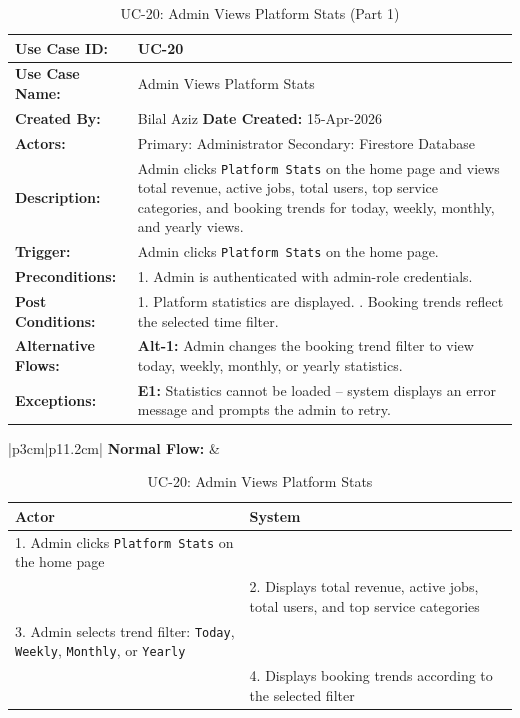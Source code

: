 {\small
\renewcommand{\arraystretch}{1.05}
\begin{table}[H]
\centering
\begin{tabular}{|p{3cm}|p{11.2cm}|}
\hline
\textbf{Use Case ID:} & UC-20 \\ \hline
\textbf{Use Case Name:} & Admin Views Platform Stats \\ \hline
\textbf{Created By:} & Bilal Aziz \hfill \textbf{Date Created:} 15-Apr-2026 \\ \hline
\textbf{Actors:} & Primary: Administrator \quad Secondary: Firestore Database \\ \hline
\textbf{Description:} & Admin clicks \texttt{Platform Stats} on the home page and views total revenue, active jobs, total users, top service categories, and booking trends for today, weekly, monthly, and yearly views. \\ \hline
\textbf{Trigger:} & Admin clicks \texttt{Platform Stats} on the home page. \\ \hline
\textbf{Preconditions:} & 1. Admin is authenticated with admin-role credentials. \\ \hline
\textbf{Post Conditions:} & 1. Platform statistics are displayed. \newline 2. Booking trends reflect the selected time filter. \\ \hline
\textbf{Alternative Flows:} & \textbf{Alt-1:} Admin changes the booking trend filter to view today, weekly, monthly, or yearly statistics. \\ \hline
\textbf{Exceptions:} & \textbf{E1:} Statistics cannot be loaded -- system displays an error message and prompts the admin to retry. \\ \hline
\end{tabular}
\caption*{UC-20: Admin Views Platform Stats (Part 1)}
\end{table}
}

\newpage

{\small
\renewcommand{\arraystretch}{1.05}
\begin{table}[H]
\centering
\begin{tabular}{|p{3cm}|p{11.2cm}|}
\hline
\textbf{Normal Flow:} &
\begin{tabular}[t]{|p{5.4cm}|p{5.4cm}|}
\hline
\textbf{Actor} & \textbf{System} \\ \hline
1. Admin clicks \texttt{Platform Stats} on the home page & \\ \hline
 & 2. Displays total revenue, active jobs, total users, and top service categories \\ \hline
3. Admin selects trend filter: \texttt{Today}, \texttt{Weekly}, \texttt{Monthly}, or \texttt{Yearly} & \\ \hline
 & 4. Displays booking trends according to the selected filter \\ \hline
\end{tabular} \\ \hline
\end{tabular}
\caption{UC-20: Admin Views Platform Stats}
\end{table}
}
\newpage

